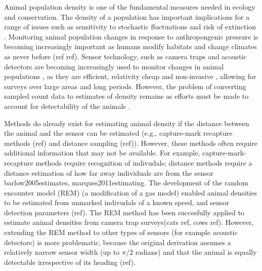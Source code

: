 Animal population density is one of the fundamental measures needed in ecology and conservation. The density of a population has important implications for a range of issues such as sensitivity to stochastic fluctuations \citep{richter1972extinction,wright1983stochastic} and risk of extinction \citep{purvis2000predicting}. Monitoring animal population changes in response to anthropongenic pressure is becoming increasingly important as humans modify habitats and change climates as never before (ref ref). Sensor technology, such as camera traps \citep{rowcliffe2008surveys,ahumada2011community} and acoustic detectors \citep{ofarrel1999comparison,mellinger2007fixed,walters2012continental} are becoming increasingly used to monitor changes in animal populations \citep{rowcliffe2008surveys, kessel2014review}, as they are efficient, relativity cheap and non-invasive \citep{gese2001monitoring, o2003crouching, silveira2003camera}, allowing for surveys over large areas and long periods. However, the problem of converting sampled count data to estimates of density remains as efforts must be made to account for detectability of the animals \citep{dail2011models, chandler2011inference, solymos2013calibrating}.


Methods do already exist for estimating animal density if the distance between the animal and the sensor can be estimated (e.g., capture-mark recapture methods (ref) and distance sampling (ref)). However, these methods often require additional information that may not be available. For example, capture-mark-recapture methods \citep{karanth1995, trolle2003estimation, soisalo2006estimating, trolle2007camera} require recognition of indivudals; distance methods require a distance estimation of how far away individuals are from the sensor {barlow2005estimates, marques2011estimating}. The development of the random encounter model (REM) (a modification of a gas model) enabled animal densities to be estimated from unmarked indivudals of a known speed, and sensor detection parameters (ref). The REM method has been succesfully applied to estimate animal densities from camera trap surveys(cats ref, cows ref). However, extending the REM method to other types of sensors (for example acoustic detectors) is more problematic, because the original derivation assumes a relatively narrow sensor width (up to $\pi/2$ radians) and that the animal is equally detectable irrespective of its heading (ref).

